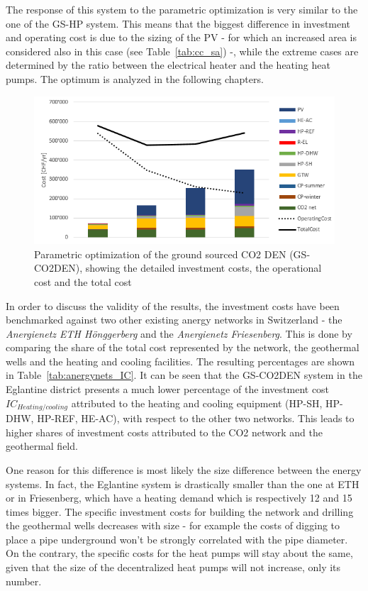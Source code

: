 \documentclass{article}
\begin{document}
The response of this system to the parametric optimization is very similar to the one of the GS-HP system. This means that the biggest difference in investment and operating cost is due to the sizing of the PV - for which an increased area is considered also in this case (see Table~\ref{tab:cc_sa}) -, while the extreme cases are determined by the ratio between the electrical heater and the heating heat pumps. The optimum is analyzed in the following chapters.\\

\begin{figure}[htp]
	\centering
	\includegraphics[width=1\textwidth]{V_CO2_G_PO1.png}
	\caption{Parametric optimization of the ground sourced CO2 DEN (GS-CO2DEN), showing the detailed investment costs, the operational cost and the total cost}
	\label{fig:V_CO2_G_PO}
\end{figure}

In order to discuss the validity of the results, the investment costs have been benchmarked against two other existing anergy networks in Switzerland - the \textit{Anergienetz ETH Hönggerberg }and the \textit{Anergienetz Friesenberg}. This is done by comparing the share of the total cost represented by the network, the geothermal wells and the heating and cooling facilities. The resulting percentages are shown in Table~\ref{tab:anergynets_IC}. It can be seen that the GS-CO2DEN system in the Eglantine district presents a much lower percentage of the investment cost  $IC_{Heating/cooling}$ attributed to the heating and cooling equipment (HP-SH, HP-DHW, HP-REF, HE-AC), with respect to the other two networks. This leads to higher shares of investment costs attributed to the CO2 network and the geothermal field.



One reason for this difference is most likely the size difference between the energy systems. In fact, the Eglantine system is drastically smaller than the one at ETH or in Friesenberg, which have a heating demand which is respectively 12 and 15 times bigger. The specific investment costs for building the network and drilling the geothermal wells decreases with size - for example the costs of digging to place a pipe underground won't be strongly correlated with the pipe diameter. On the contrary, the specific costs for the heat pumps will stay about the same, given that the size of the decentralized heat pumps will not increase, only its number.
\end{document}
